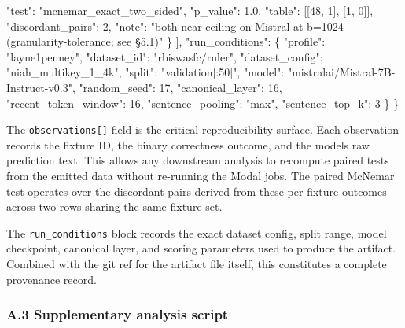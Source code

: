\documentclass[
]{article}
\newenvironment{Shaded}{}{}
\newcommand{\DataTypeTok}[1]{\textcolor[rgb]{0.56,0.13,0.00}{#1}}
\newcommand{\DecValTok}[1]{\textcolor[rgb]{0.25,0.63,0.44}{#1}}
\newcommand{\FloatTok}[1]{\textcolor[rgb]{0.25,0.63,0.44}{#1}}
\newcommand{\FunctionTok}[1]{\textcolor[rgb]{0.02,0.16,0.49}{#1}}
\newcommand{\OtherTok}[1]{\textcolor[rgb]{0.00,0.44,0.13}{#1}}
\newcommand{\StringTok}[1]{\textcolor[rgb]{0.25,0.44,0.63}{#1}}
\begin{document}
\begin{Shaded}
\begin{Highlighting}[]
      \DataTypeTok{"test"}\FunctionTok{:} \StringTok{"mcnemar\_exact\_two\_sided"}\FunctionTok{,}
      \DataTypeTok{"p\_value"}\FunctionTok{:} \FloatTok{1.0}\FunctionTok{,}
      \DataTypeTok{"table"}\FunctionTok{:} \OtherTok{[[}\DecValTok{48}\OtherTok{,} \DecValTok{1}\OtherTok{],} \OtherTok{[}\DecValTok{1}\OtherTok{,} \DecValTok{0}\OtherTok{]]}\FunctionTok{,}
      \DataTypeTok{"discordant\_pairs"}\FunctionTok{:} \DecValTok{2}\FunctionTok{,}
      \DataTypeTok{"note"}\FunctionTok{:} \StringTok{"both near ceiling on Mistral at b=1024 (granularity{-}tolerance; see §5.1)"}
    \FunctionTok{\}}
  \OtherTok{]}\FunctionTok{,}
  \DataTypeTok{"run\_conditions"}\FunctionTok{:} \FunctionTok{\{}
    \DataTypeTok{"profile"}\FunctionTok{:} \StringTok{"layne1penney"}\FunctionTok{,}
    \DataTypeTok{"dataset\_id"}\FunctionTok{:} \StringTok{"rbiswasfc/ruler"}\FunctionTok{,}
    \DataTypeTok{"dataset\_config"}\FunctionTok{:} \StringTok{"niah\_multikey\_1\_4k"}\FunctionTok{,}
    \DataTypeTok{"split"}\FunctionTok{:} \StringTok{"validation[:50]"}\FunctionTok{,}
    \DataTypeTok{"model"}\FunctionTok{:} \StringTok{"mistralai/Mistral{-}7B{-}Instruct{-}v0.3"}\FunctionTok{,}
    \DataTypeTok{"random\_seed"}\FunctionTok{:} \DecValTok{17}\FunctionTok{,}
    \DataTypeTok{"canonical\_layer"}\FunctionTok{:} \DecValTok{16}\FunctionTok{,}
    \DataTypeTok{"recent\_token\_window"}\FunctionTok{:} \DecValTok{16}\FunctionTok{,}
    \DataTypeTok{"sentence\_pooling"}\FunctionTok{:} \StringTok{"max"}\FunctionTok{,}
    \DataTypeTok{"sentence\_top\_k"}\FunctionTok{:} \DecValTok{3}
  \FunctionTok{\}}
\FunctionTok{\}}
\end{Highlighting}
\end{Shaded}

The \texttt{observations{[}{]}} field is the critical reproducibility
surface. Each observation records the fixture ID, the binary correctness
outcome, and the model\textquotesingle s raw prediction text. This
allows any downstream analysis to recompute paired tests from the
emitted data without re-running the Modal jobs. The paired McNemar test
operates over the discordant pairs derived from these per-fixture
outcomes across two rows sharing the same fixture set.

The \texttt{run\_conditions} block records the exact dataset config,
split range, model checkpoint, canonical layer, and scoring parameters
used to produce the artifact. Combined with the git ref for the artifact
file itself, this constitutes a complete provenance record.

\subsubsection{A.3 Supplementary analysis
script}\label{a3-supplementary-analysis-script}
\end{document}
